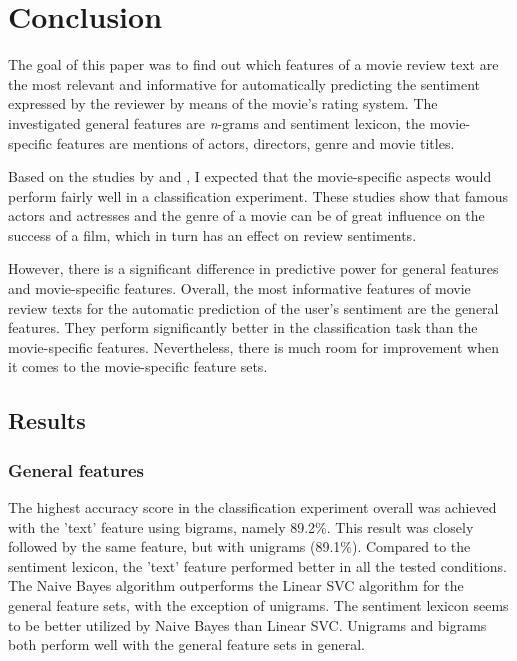 \documentclass[
10pt, %
a4paper, %
oneside, %
headinclude,footinclude, %
] {book}%
\begin{document}
\chapter{Conclusion}

The goal of this paper was to find out which features of a movie review text are the most relevant and informative for automatically predicting the sentiment expressed by the reviewer by means of the movie's rating system. The investigated general features are \textit n-grams and sentiment lexicon, the movie-specific features are mentions of actors, directors, genre and movie titles. 

Based on the studies by \citet{simonoff2000predicting} and \citet{eliashberg1997film}, I expected that the movie-specific aspects would perform fairly well in a classification experiment. These studies show that famous actors and actresses and the genre of a movie can be of great influence on the success of a film, which in turn has an effect on review sentiments. 

However, there is a significant difference in predictive power for general features and movie-specific features. Overall, the most informative features of movie review texts for the automatic prediction of the user's sentiment are the general features. They perform significantly better in the classification task than the movie-specific features. Nevertheless, there is much room for improvement when it comes to the movie-specific feature sets.

\section{Results}

\subsection{General features}

The highest accuracy score in the classification experiment overall was achieved with the 'text' feature using bigrams, namely 89.2\%. This result was closely followed by the same feature, but with unigrams (89.1\%). Compared to the sentiment lexicon, the 'text' feature performed better in all the tested conditions. The Naive Bayes algorithm outperforms the Linear SVC algorithm for the general feature sets, with the exception of unigrams. The sentiment lexicon seems to be better utilized by Naive Bayes than Linear SVC. Unigrams and bigrams both perform well with the general feature sets in general.
\end{document}
